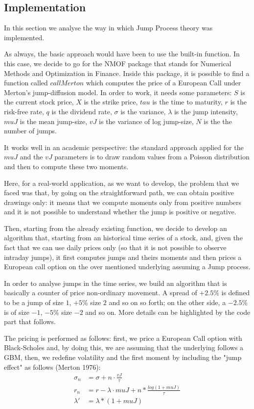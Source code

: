\documentclass[paper=a4, fontsize=12pt]{scrartcl} %
\numberwithin{equation}{section}
\begin{document}
\newpage

\subsection{Implementation}
In this section we analyse the way in which Jump Process theory was implemented. \par
As always, the basic approach would have been to use the built-in function. In this case, we decide to go for the NMOF package that stands for Numerical Methods and Optimization in Finance. Inside this package, it is possible to find a function called  $callMerton$ which computes the price of a European Call under Merton's jump-diffusion model. In order to work, it needs some parameters: $S$ is the current stock price, $X$ is the strike price, $tau$ is the time to maturity, $r$ is the risk-free rate, $q$ is the dividend rate, $\sigma$ is the variance, $\lambda$ is the jump intensity, $muJ$ is the mean jump-size, $vJ$ is the variance of log jump-size, $N$ is the the number of jumps.  \par
It works well in an academic perspective: the standard approach applied for the $muJ$ and the $vJ$ parameters is to draw random values from a Poisson distribution and then to compute these two moments. \par
Here, for a real-world application, as we want to develop, the problem that we faced was that, by going on the straightforward path, we can obtain positive drawings only: it means that we compute moments only from positive numbers and it is not possible to understand whether the jump is positive or negative. \par
Then, starting from the already existing function, we decide to develop an algorithm that, starting from an historical time series of a stock, and, given the fact that we can use daily prices only (so that it is not possible to observe intraday jumps), it first computes jumps and theirs moments and then prices a European call option on the over mentioned underlying assuming a Jump process. \par
In order to analyse jumps in the time series, we build an algorithm that is basically a counter of price non-ordinary movement. A spread of $+2.5\%$ is defined to be a jump of size $1$, $+5\%$ size $2$ and so on so forth; on the other side, a $-2.5\%$ is of size $-1$, $-5\%$ size $-2$ and so on. More details can be highlighted by the code part that follows. \par
The pricing is performed as follows: first, we price a European Call option with Black-Scholes and, by doing this, we are assuming that the underlying follows a GBM, then, we redefine volatility and the first moment by including the "jump effect" as follows (Merton 1976):
	\begin{equation}
	\begin{aligned}
		\sigma_n &= \sigma + n \cdot \frac{vJ}{\tau} \\
 		r_n & = r - \lambda \cdot muJ + n * \frac{log(1 + muJ)}{\tau} \\
		\lambda' &= \lambda * (1 + muJ)
	\end{aligned}
	\end{equation}
\end{document}
